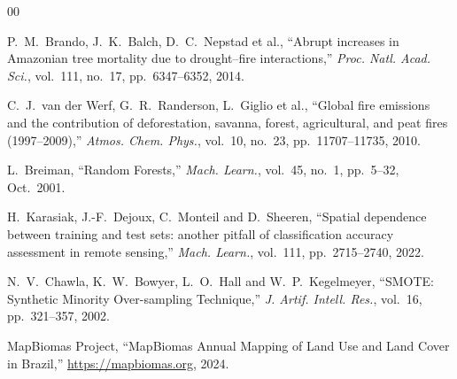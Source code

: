 \documentclass[conference]{IEEEtran}
\begin{document}
\begin{thebibliography}{00}

P.~M.~Brando, J.~K.~Balch, D.~C.~Nepstad et al.,
``Abrupt increases in Amazonian tree mortality due to drought–fire interactions,''
\textit{Proc. Natl. Acad. Sci.}, vol.~111, no.~17, pp.~6347--6352, 2014.

C.~J.~van der Werf, G.~R.~Randerson, L.~Giglio et al.,
``Global fire emissions and the contribution of deforestation, savanna, forest,
agricultural, and peat fires (1997--2009),''
\textit{Atmos. Chem. Phys.}, vol.~10, no.~23, pp.~11707--11735, 2010.

L.~Breiman,
``Random Forests,''
\textit{Mach. Learn.}, vol.~45, no.~1, pp.~5--32, Oct.\ 2001.

H.~Karasiak, J.-F.~Dejoux, C.~Monteil and D.~Sheeren,
``Spatial dependence between training and test sets: another pitfall of
classification accuracy assessment in remote sensing,''
\textit{Mach. Learn.}, vol.~111, pp.~2715--2740, 2022.

N.~V.~Chawla, K.~W.~Bowyer, L.~O.~Hall and W.~P.~Kegelmeyer,
``SMOTE: Synthetic Minority Over-sampling Technique,''
\textit{J. Artif. Intell. Res.}, vol.~16, pp.~321--357, 2002.

MapBiomas Project,
``MapBiomas Annual Mapping of Land Use and Land Cover in Brazil,''
\url{https://mapbiomas.org}, 2024.

\end{thebibliography}
\end{document}
